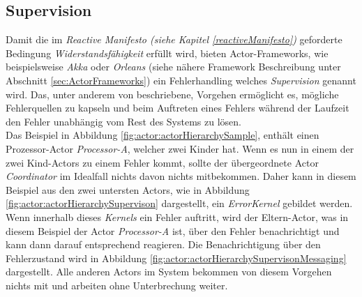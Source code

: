 \subsection{Supervision}\label{actor:supervision}
Damit die im \textit{Reactive Manifesto (siehe Kapitel \ref{reactiveManifesto})} geforderte Bedingung \textit{Widerstandsfähigkeit} erfüllt wird, bieten Actor-Frameworks, wie beispielsweise \textit{Akka} oder \textit{Orleans} (siehe nähere Framework Beschreibung unter Abschnitt \ref{sec:ActorFrameworks}) ein Fehlerhandling welches \textit{Supervision} genannt wird. Das, unter anderem von \cite{sargent2016play} beschriebene, Vorgehen ermöglicht es, mögliche Fehlerquellen zu kapseln und beim Auftreten eines Fehlers während der Laufzeit den Fehler unabhängig vom Rest des Systems zu lösen.\\
Das Beispiel in Abbildung \ref{fig:actor:actorHierarchySample}, enthält einen Prozessor-Actor \textit{Processor-A}, welcher zwei Kinder hat. Wenn es nun in einem der zwei Kind-Actors zu einem Fehler kommt, sollte der übergeordnete Actor \textit{Coordinator} im Idealfall nichts davon nichts mitbekommen. Daher kann in diesem Beispiel aus den zwei untersten Actors, wie in Abbildung \ref{fig:actor:actorHierarchySupervison} dargestellt, ein \textit{ErrorKernel} gebildet werden. Wenn innerhalb dieses \textit{Kernels} ein Fehler auftritt, wird der Eltern-Actor, was in diesem Beispiel der Actor \textit{Processor-A} ist, über den Fehler benachrichtigt und kann dann darauf entsprechend reagieren. Die Benachrichtigung über den Fehlerzustand wird in Abbildung \ref{fig:actor:actorHierarchySupervisonMessaging} dargestellt. Alle anderen Actors im System bekommen von diesem Vorgehen nichts mit und arbeiten ohne Unterbrechung weiter. \\
